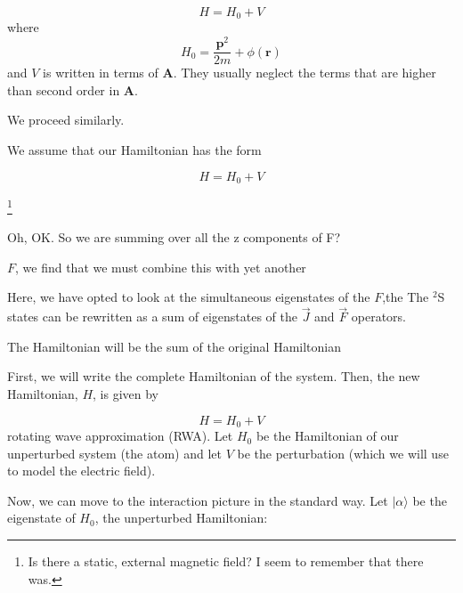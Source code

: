 \begin{equation}
H=H_0+V
\end{equation}
where 
\begin{equation}
H_0=\frac{\mathbf{p}^2}{2m}+\phi(\mathbf{r})
\end{equation}
and $V$ is written in terms of $\mathbf{A}$. They usually neglect the terms that are higher than second order in $\mathbf{A}$.

We proceed similarly. 

We assume that our Hamiltonian has the form 

\begin{equation}
H=H_0+V
\end{equation}


\footnote{Is there a static, external magnetic field? I seem to remember that there was.}





Oh, OK. So we are summing over all the z components of F?


$F$, we find that we must combine this with yet another 

Here, we have opted to look at the simultaneous eigenstates of the $F$,the The $^2$S states can be rewritten as a sum of eigenstates of the $\vec{J}$ and $\vec{F}$ operators. 


The Hamiltonian will be the sum of the original Hamiltonian 

First, we will write the complete Hamiltonian of the system.
Then, the new Hamiltonian, $H$, is given by 

\begin{equation}
H=H_0+V
\end{equation}
rotating wave approximation (RWA). Let $H_0$ be the Hamiltonian of our unperturbed system (the atom) and let $V$ be the perturbation (which we will use to model the electric field). 


Now, we can move to the interaction picture in the standard way. Let $|\alpha\rangle$ be the eigenstate of $H_0$, the unperturbed Hamiltonian: 

